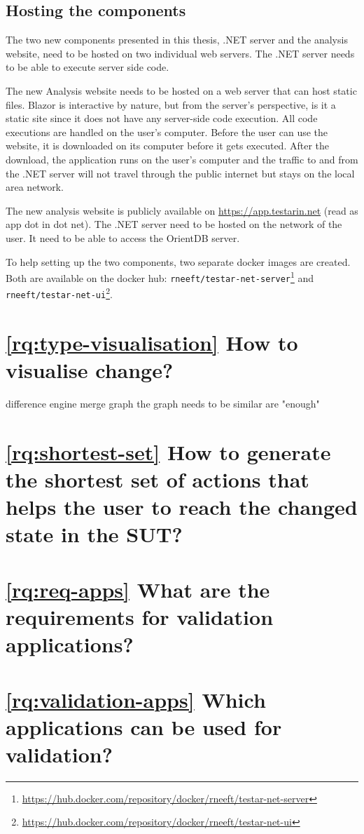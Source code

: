 \subsection{Hosting the components}
The two new components presented in this thesis, .NET server and the \testar analysis website, need to be hosted on two individual web servers. The .NET server needs to be able to execute server side code. 

The new \testar Analysis website needs to be hosted on a web server that can host static files. Blazor is interactive by nature, but from the server's perspective, is it a static site since it does not have any server-side code execution. All code executions are handled on the user's computer. Before the user can use the website, it is downloaded on its computer before it gets executed. After the download, the application runs on the user's computer and the traffic to and from the .NET server will not travel through the public internet but stays on the local area network. 

The new \testar analysis website is publicly available on \url{https://app.testarin.net} (read as app dot \testar in dot net). The .NET server need to be hosted on the network of the user. It need to be able to access the OrientDB server. 

To help setting up the two components, two separate docker images are created. Both are available on the docker hub: \verb|rneeft/testar-net-server|\footnote{\url{https://hub.docker.com/repository/docker/rneeft/testar-net-server}} and \verb|rneeft/testar-net-ui|\footnote{\url{https://hub.docker.com/repository/docker/rneeft/testar-net-ui}}.



\section{\ref{rq:type-visualisation} How to visualise change?}

difference engine
merge graph \cite{andrews2009visual}
the graph needs to be similar are "enough"

\section{\ref{rq:shortest-set} How to generate the shortest set of actions that helps the user to reach the changed state in the SUT?}

\section{\ref{rq:req-apps} What are the requirements for validation applications?}

\section{\ref{rq:validation-apps} Which applications can be used for validation?}
